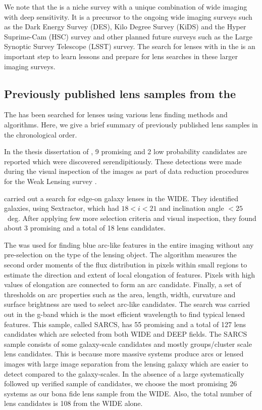 \documentclass[useAMS,usenatbib,a4paper]{mn2e}
\begin{document}
We note that the \cfhtls is a niche survey with a unique combination of wide
imaging with deep sensitivity. It is a precursor to the ongoing wide imaging
surveys such as the Dark Energy Survey (DES), Kilo Degree Survey (KiDS) and the
Hyper Suprime-Cam (HSC) survey and other planned future surveys such as the
Large Synoptic Survey Telescope (LSST) survey.  The search for lenses with \sw
in the \cfhtls is an important step to learn lessons and prepare for lens
searches in these larger imaging surveys.



\subsection{Previously published lens samples from the \cfhtls}
\label{sec:data:kls}

The \cfhtls has been searched for lenses using various lens finding
methods and algorithms. Here, we give a brief summary of previously published lens
samples in the chronological order.

In the thesis dissertation of \citet{Thanjavur2009}, 9 promising and 2
low probability candidates are reported which were discovered
serendipitiously. These detections were made during the visual
inspection of the \cfhtls images as part of data reduction procedures
for the Weak Lensing survey \citep{Benjamin2007}.

\citet{Sygnet2010} carried out a search for edge-on galaxy lenses in the
\cfhtls WIDE. They identified galaxies, using {\sc Sextractor}, which
had $18<i<21$ and inclination angle $<25$~deg. After applying few more
selection criteria and visual inspection, they found about 3 promising
and a total of 18 lens candidates.

The \af \citep{More2012} was used for finding blue arc-like features in
the entire \cfhtls imaging without any pre-selection on the type of the lensing
object. The algorithm measures the second order moments of the flux distribution
in pixels within small regions to estimate the direction and extent of local
elongation of features. Pixels with high values of elongation are connected to
form an arc candidate. Finally, a set of thresholds on arc properties such as
the area, length, width, curvature and surface brightness are used to select
arc-like candidates. The search was carried out in the g-band which is the most
efficient wavelength to find typical lensed features.  This sample, called
SARCS, has 55 promising and a total of 127 lens candidates which are selected
from both \cfhtls WIDE and DEEP fields. The SARCS sample consists of some
galaxy-scale candidates and mostly groups/cluster scale lens candidates. This is
because more massive systems produce arcs or lensed images with large image
separation from the lensing galaxy which are easier to detect compared to the
galaxy-scales. In the absence of a large systematically followed up
verified sample of candidates, we choose the most promising 26 systems
as our bona fide lens sample from the \cfhtls WIDE. Also, the total
number of lens candidates is 108 from the \cfhtls WIDE alone.
\end{document}
